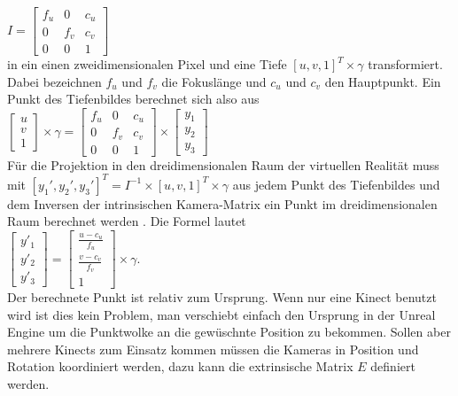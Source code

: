 \documentclass[a4paper]{IEEEtran}
\begin{document}
$I = \begin{bmatrix}
f_u & 0 & c_u  \\
0 & f_v & c_v  \\
0 & 0 & 1  
\end{bmatrix}$\\[1cm]

	in ein einen zweidimensionalen Pixel und eine Tiefe $[u,v,1]^T \times \gamma$ transformiert. 
	Dabei bezeichnen $f_u$ und $f_v$ die Fokuslänge und $c_u$ und $c_v$ den Hauptpunkt. 
	Ein Punkt des Tiefenbildes berechnet sich also aus \\[1cm]

$\begin{bmatrix}
u \\
v \\
1
\end{bmatrix}
\times
\gamma
= \begin{bmatrix}
f_u & 0 & c_u  \\
0 & f_v & c_v  \\
0 & 0 & 1  
\end{bmatrix}
\times
\begin{bmatrix}
y_1 \\
y_2 \\
y_3
\end{bmatrix}$\\[1cm]

	Für die Projektion in den dreidimensionalen Raum der virtuellen Realität muss mit $[y_1',y_2',y_3']^T = I^{-1} \times [u,v,1]^T \times \gamma$ aus jedem Punkt des Tiefenbildes und dem Inversen der intrinsischen Kamera-Matrix ein Punkt im dreidimensionalen Raum berechnet werden \cite{TEO}.
	Die Formel lautet \\[1cm]

$\begin{bmatrix}
y'_1 \\
y'_2 \\
y'_3
\end{bmatrix}
= \begin{bmatrix}
\frac{u - c_u}{f_u} \\
\frac{v - c_v}{f_v}  \\
1  
\end{bmatrix}
\times
\gamma$.\\[1cm]

	Der berechnete Punkt ist relativ zum Ursprung. 
	Wenn nur eine Kinect benutzt wird ist dies kein Problem, man verschiebt einfach den Ursprung in der Unreal Engine um die Punktwolke an die gewüschnte Position zu bekommen. 
	Sollen aber mehrere Kinects zum Einsatz kommen müssen die Kameras in Position und Rotation koordiniert werden, dazu kann die extrinsische Matrix $E$ definiert werden. \\[1cm]
\end{document}
